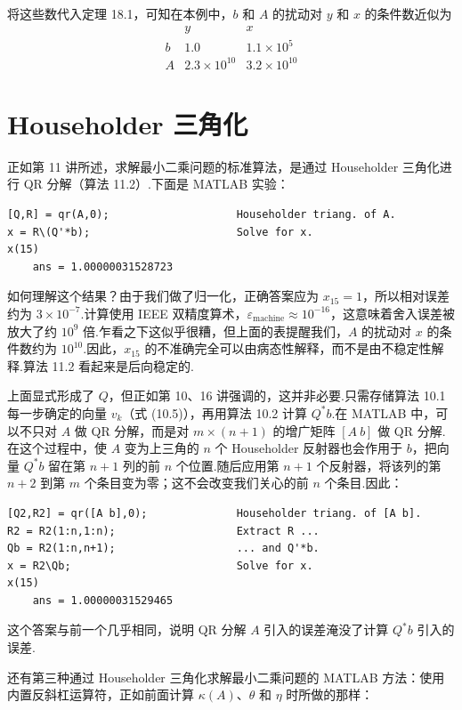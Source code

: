 \documentclass[UTF8,fontset=none,12pt]{ctexart}
\newcommand{\epsmach}{\varepsilon_{\mathrm{machine}}}
\theoremstyle{definition}
\begin{document}
将这些数代入定理 18.1，可知在本例中，$b$ 和 $A$ 的扰动对 $y$ 和 $x$ 的条件数近似为
\[
\begin{array}{c|cc}
 & y & x\\
\hline
b&1.0&1.1\times10^5\\
A&2.3\times10^{10}&3.2\times10^{10}
\end{array}
\]

\section*{Householder 三角化}

正如第 11 讲所述，求解最小二乘问题的标准算法，是通过 Householder 三角化进行 QR 分解（算法 11.2）.下面是 MATLAB 实验：

\begin{verbatim}
[Q,R] = qr(A,0);                    Householder triang. of A.
x = R\(Q'*b);                       Solve for x.
x(15)
    ans = 1.00000031528723
\end{verbatim}

如何理解这个结果？由于我们做了归一化，正确答案应为 $x_{15}=1$，所以相对误差约为 $3\times10^{-7}$.计算使用 IEEE 双精度算术，$\epsmach\approx10^{-16}$，这意味着舍入误差被放大了约 $10^9$ 倍.乍看之下这似乎很糟，但上面的表提醒我们，$A$ 的扰动对 $x$ 的条件数约为 $10^{10}$.因此，$x_{15}$ 的不准确完全可以由病态性解释，而不是由不稳定性解释.算法 11.2 看起来是后向稳定的.

上面显式形成了 $Q$，但正如第 10、16 讲强调的，这并非必要.只需存储算法 10.1 每一步确定的向量 $v_k$（式 (10.5)），再用算法 10.2 计算 $Q^*b$.在 MATLAB 中，可以不只对 $A$ 做 QR 分解，而是对 $m\times(n+1)$ 的增广矩阵 $[A\ b]$ 做 QR 分解.在这个过程中，使 $A$ 变为上三角的 $n$ 个 Householder 反射器也会作用于 $b$，把向量 $Q^*b$ 留在第 $n+1$ 列的前 $n$ 个位置.随后应用第 $n+1$ 个反射器，将该列的第 $n+2$ 到第 $m$ 个条目变为零；这不会改变我们关心的前 $n$ 个条目.因此：

\begin{verbatim}
[Q2,R2] = qr([A b],0);              Householder triang. of [A b].
R2 = R2(1:n,1:n);                   Extract R ...
Qb = R2(1:n,n+1);                   ... and Q'*b.
x = R2\Qb;                          Solve for x.
x(15)
    ans = 1.00000031529465
\end{verbatim}

这个答案与前一个几乎相同，说明 QR 分解 $A$ 引入的误差淹没了计算 $Q^*b$ 引入的误差.

还有第三种通过 Householder 三角化求解最小二乘问题的 MATLAB 方法：使用内置反斜杠运算符，正如前面计算 $\kappa(A)$、$\theta$ 和 $\eta$ 时所做的那样：
\end{document}
